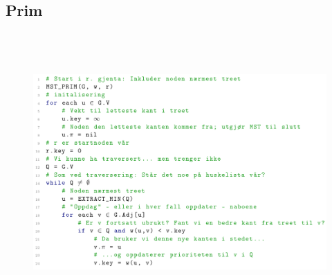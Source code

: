 \documentclass[12pt]{report}
\begin{document}

\par


\vspace{\baselineskip}

\vspace{\baselineskip}

\vspace{\baselineskip}
\subsection*{Prim}



\begin{figure}[H]
	\begin{Center}
		\includegraphics[width=6.3in,height=4.19in]{./media/image190.png}
	\end{Center}
\end{figure}



\par


\vspace{\baselineskip}



\newpage
\end{document}
